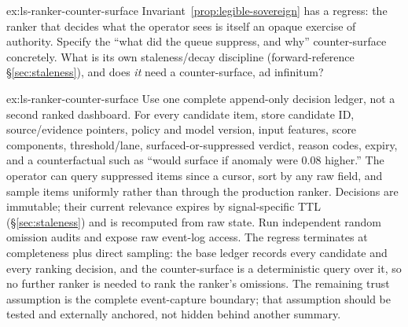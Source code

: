 \documentclass[11pt,a4paper]{article}
\theoremstyle{definition}
\theoremstyle{plain}
\begin{document}
\begin{pdexercise}[kind=Open,rating=3]{ex:ls-ranker-counter-surface}
Invariant~\ref{prop:legible-sovereign} has a regress: the ranker that
decides what the operator sees is itself an opaque exercise of authority. Specify
the ``what did the queue suppress, and why'' counter-surface concretely. What is its
own staleness/decay discipline (forward-reference \S\ref{sec:staleness}), and does
\emph{it} need a counter-surface, ad infinitum?
\end{pdexercise}
\begin{pdsolution}{ex:ls-ranker-counter-surface}
Use one complete append-only decision ledger, not a second ranked dashboard. For every candidate item, store candidate ID, source/evidence pointers, policy and model version, input features, score components, threshold/lane, surfaced-or-suppressed verdict, reason codes, expiry, and a counterfactual such as ``would surface if anomaly were 0.08 higher.'' The operator can query suppressed items since a cursor, sort by any raw field, and sample items uniformly rather than through the production ranker. Decisions are immutable; their current relevance expires by signal-specific TTL (\S\ref{sec:staleness}) and is recomputed from raw state. Run independent random omission audits and expose raw event-log access. The regress terminates at completeness plus direct sampling: the base ledger records every candidate and every ranking decision, and the counter-surface is a deterministic query over it, so no further ranker is needed to rank the ranker's omissions. The remaining trust assumption is the complete event-capture boundary; that assumption should be tested and externally anchored, not hidden behind another summary.
\end{pdsolution}

\end{document}
